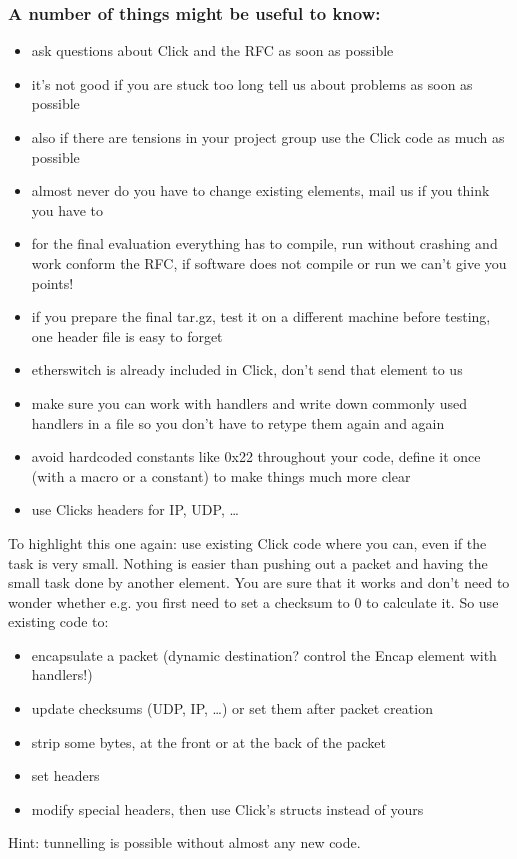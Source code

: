 \documentclass[a4paper]{article}
\begin{document}
\subsubsection*{A number of things might be useful to know:}

\begin{itemize}
\item
  ask questions about Click and the RFC as soon as possible
\item
  it's not good if you are stuck too long tell us about problems as soon
  as possible
\item
  also if there are tensions in your project group use the Click code as
  much as possible
\item
  almost never do you have to change existing elements, mail us if you
  think you have to
\item
  for the final evaluation everything has to compile, run without
  crashing and work conform the RFC, if software does not compile or run
  we can't give you points!
\item
  if you prepare the final tar.gz, test it on a different machine before
  testing, one header file is easy to forget
\item
  etherswitch is already included in Click, don't send that element to
  us
\item
  make sure you can work with handlers and write down commonly used
  handlers in a file so you don't have to retype them again and again
\item
  avoid hardcoded constants like 0x22 throughout your code, define it
  once (with a macro or a constant) to make things much more clear
\item
  use Clicks headers for IP, UDP, \ldots{}
\end{itemize}

To highlight this one again: use existing Click code where you can, even
if the task is very small. Nothing is easier than pushing out a packet
and having the small task done by another element. You are sure that it
works and don't need to wonder whether e.g. you first need to set a
checksum to 0 to calculate it. So use existing code to:

\begin{itemize}
\item
  encapsulate a packet (dynamic destination? control the Encap element
  with handlers!)
\item
  update checksums (UDP, IP, \ldots{}) or set them after packet creation
\item
  strip some bytes, at the front or at the back of the packet
\item
  set headers
\item
  modify special headers, then use Click's structs instead of yours
\end{itemize}

Hint: tunnelling is possible without almost any new code.
\end{document}
